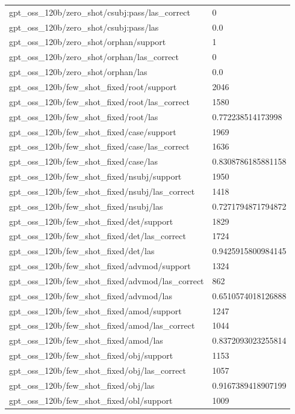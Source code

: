 \begin{tabular}{ll}
gpt\_oss\_120b/zero\_shot/csubj:pass/las\_correct & 0 \\
gpt\_oss\_120b/zero\_shot/csubj:pass/las & 0.0 \\
gpt\_oss\_120b/zero\_shot/orphan/support & 1 \\
gpt\_oss\_120b/zero\_shot/orphan/las\_correct & 0 \\
gpt\_oss\_120b/zero\_shot/orphan/las & 0.0 \\
gpt\_oss\_120b/few\_shot\_fixed/root/support & 2046 \\
gpt\_oss\_120b/few\_shot\_fixed/root/las\_correct & 1580 \\
gpt\_oss\_120b/few\_shot\_fixed/root/las & 0.772238514173998 \\
gpt\_oss\_120b/few\_shot\_fixed/case/support & 1969 \\
gpt\_oss\_120b/few\_shot\_fixed/case/las\_correct & 1636 \\
gpt\_oss\_120b/few\_shot\_fixed/case/las & 0.8308786185881158 \\
gpt\_oss\_120b/few\_shot\_fixed/nsubj/support & 1950 \\
gpt\_oss\_120b/few\_shot\_fixed/nsubj/las\_correct & 1418 \\
gpt\_oss\_120b/few\_shot\_fixed/nsubj/las & 0.7271794871794872 \\
gpt\_oss\_120b/few\_shot\_fixed/det/support & 1829 \\
gpt\_oss\_120b/few\_shot\_fixed/det/las\_correct & 1724 \\
gpt\_oss\_120b/few\_shot\_fixed/det/las & 0.9425915800984145 \\
gpt\_oss\_120b/few\_shot\_fixed/advmod/support & 1324 \\
gpt\_oss\_120b/few\_shot\_fixed/advmod/las\_correct & 862 \\
gpt\_oss\_120b/few\_shot\_fixed/advmod/las & 0.6510574018126888 \\
gpt\_oss\_120b/few\_shot\_fixed/amod/support & 1247 \\
gpt\_oss\_120b/few\_shot\_fixed/amod/las\_correct & 1044 \\
gpt\_oss\_120b/few\_shot\_fixed/amod/las & 0.8372093023255814 \\
gpt\_oss\_120b/few\_shot\_fixed/obj/support & 1153 \\
gpt\_oss\_120b/few\_shot\_fixed/obj/las\_correct & 1057 \\
gpt\_oss\_120b/few\_shot\_fixed/obj/las & 0.9167389418907199 \\
gpt\_oss\_120b/few\_shot\_fixed/obl/support & 1009 \\

\end{tabular}
